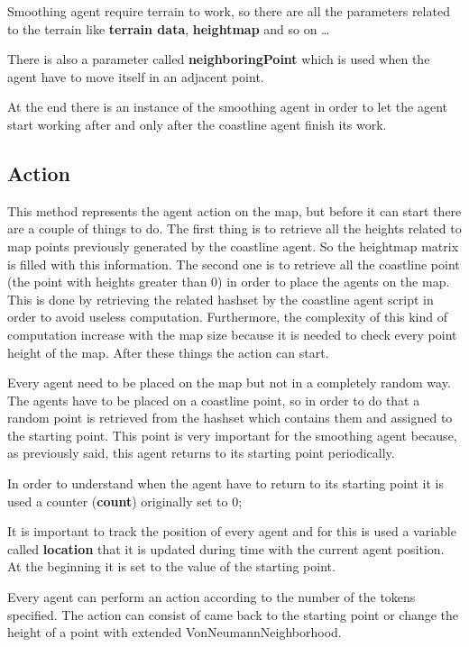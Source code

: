\documentclass[12pt]{article}
\begin{document}
    \noindent 
    Smoothing agent require terrain to work, so there are all the parameters related to the terrain like \textbf{terrain data}, \textbf{heightmap} and so on \dots

    \noindent
    There is also a parameter called \textbf{neighboringPoint} which is used when the agent have to move itself in an adjacent point.
    
    \noindent
    At the end there is an instance of the smoothing agent in order to let the agent start working after and only after the coastline agent finish its work.

    \subsection{Action}
    This method represents the agent action on the map, but before it can start there are a couple of things to do.
    The first thing is to retrieve all the heights related to map points previously generated by the coastline agent. So the heightmap matrix is filled with this information.
    The second one is to retrieve all the coastline point (the point with heights greater than 0) in order to place the agents on the map. This is done by retrieving the
    related hashset by the coastline agent script in order to avoid useless computation. Furthermore, the complexity of this kind of computation increase with the map size 
    because it is needed to check every point height of the map.
    After these things the action can start.

    Every agent need to be placed on the map but not in a completely random way. The agents have to be placed on a coastline point, so in order to do that a random point is retrieved
    from the hashset which contains them and assigned to the starting point. This point is very important for the smoothing agent because, as previously said, this agent returns
    to its starting point periodically.

    In order to understand when the agent have to return to its starting point it is used a counter (\textbf{count}) originally set to 0;
    
    It is important to track the position of every agent and for this is used a variable called \textbf{location} that it is updated during time with the current agent position. 
    At the beginning it is set to the value of the starting point.

    Every agent can perform an action according to the number of the tokens specified. The action can consist of came back to the starting point or change the height of a point
    with extended VonNeumannNeighborhood.
\end{document}
